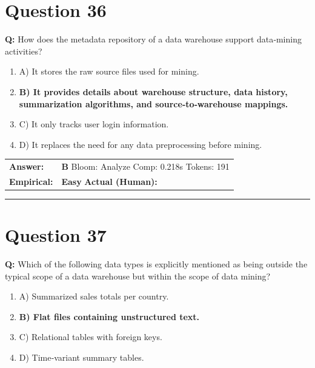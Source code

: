 \documentclass[9pt]{article}
\begin{document}
\section*{Question 36}

\textbf{Q:} How does the metadata repository of a data warehouse support data‑mining activities?

\begin{enumerate}[label=\textbf{\alph{*})}, nosep]
    \item A) It stores the raw source files used for mining.
    \item \textbf{B) It provides details about warehouse structure, data history, summarization algorithms, and source‑to‑warehouse mappings.} %
    \item C) It only tracks user login information.
    \item D) It replaces the need for any data preprocessing before mining.

\end{enumerate}

\begin{tabular}{@{}l p{10.5cm}@{}}
\textbf{Answer:} & \textbf{B} \hspace{1em} Bloom: Analyze \hspace{1em} Comp: 0.218s \hspace{1em} Tokens: 191 \\
\textbf{Empirical:} & \textbf{Easy} \hspace{1em} \textbf{Actual (Human):} \underline{\hspace{5cm}}
\end{tabular}

\vspace{0.2cm}
\rule{\textwidth}{0.4pt}
\vspace{0.2cm}


\section*{Question 37}

\textbf{Q:} Which of the following data types is explicitly mentioned as being outside the typical scope of a data warehouse but within the scope of data mining?

\begin{enumerate}[label=\textbf{\alph{*})}, nosep]
    \item A) Summarized sales totals per country.
    \item \textbf{B) Flat files containing unstructured text.} %
    \item C) Relational tables with foreign keys.
    \item D) Time‑variant summary tables.

\end{enumerate}
\end{document}
